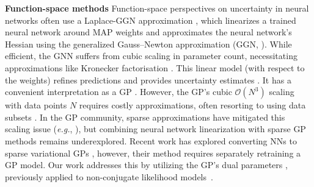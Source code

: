 \documentclass{article}
\makeatletter
\newcommand{\eg}{\textit{e.g.\@}\xspace}
\makeatother
\begin{document}
\textbf{Function-space methods}
Function-space perspectives on uncertainty in neural networks often use a Laplace-GGN approximation \citep{daxberger2021laplace}, which linearizes a trained neural network around MAP weights and approximates the neural network's Hessian using the generalized Gauss--Newton approximation (GGN, \cite{botev2017practical}).
While efficient, the GNN suffers from cubic scaling in parameter count, necessitating approximations like Kronecker factorisation \cite{martens2015optimizing, ritter2018kfac}. This linear model (with respect to the weights) refines predictions and provides uncertainty estimates \citep{immer2021scalable}. It has a convenient interpretation as a GP \cite{immer2021scalable, khan2019approximate, maddox2021fast}.
%
However, the GP's cubic $\mathcal{O}(N^3)$ scaling with data points $N$ requires costly approximations, often resorting to using data subsets \cite{immer2021scalable}. In the GP community, sparse approximations have mitigated this scaling issue (\eg, \cite{titsias2009variational,hensman2013gaussian}),
but combining neural network linearization with sparse GP methods remains underexplored.
Recent work has explored converting NNs to sparse variational GPs \cite{ortega2023variational}, however, their method requires separately retraining a GP model.
Our work addresses this by utilizing the GP's dual parameters \cite{csato2002sparse}, previously applied to non-conjugate likelihood models~\cite{adam2021dual}.

%
\end{document}
